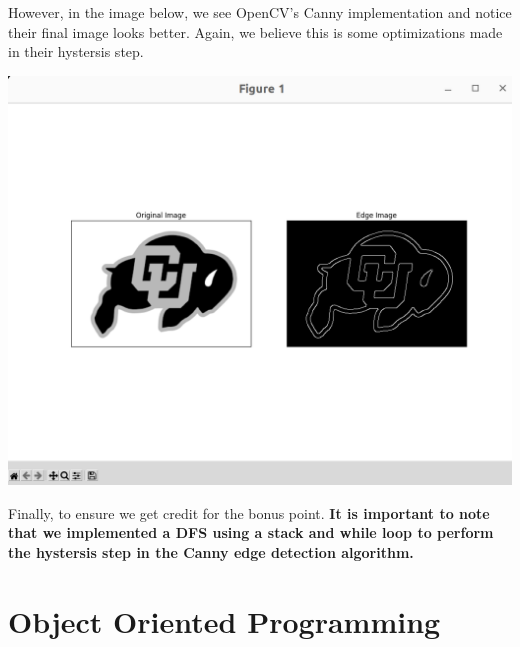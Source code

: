 \documentclass{article}
\numberwithin{equation}{section} %
\numberwithin{figure}{section} %
\numberwithin{table}{section} %
\begin{document}
\begin{framed}
However, in the image below, we see OpenCV's Canny implementation and notice their final image looks better.  Again, we believe this is some optimizations made in their hystersis step.

\begin{center}
\includegraphics[scale=.25]{thierCanny.png}
\end{center}

Finally, to ensure we get credit for the bonus point.  \textbf{It is important to note that we implemented a DFS using a stack and while loop to perform the hystersis step in the Canny edge detection algorithm.}

\end{framed}


\section{Object Oriented Programming}
\end{document}
